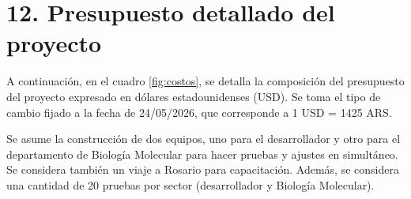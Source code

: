 \documentclass[
11pt, %
]{charter}
\begin{document}
\section{12. Presupuesto detallado del proyecto}
\label{sec:presupuesto}

A continuación, en el cuadro \ref{fig:costos}, se detalla la composición del presupuesto del proyecto expresado en dólares estadounidenses (USD). Se toma el tipo de cambio fijado a la fecha de 24/05/2026, que corresponde a 1 USD = 1425 ARS.

Se asume la construcción de dos equipos, uno para el desarrollador y otro para el departamento de Biología Molecular para hacer pruebas y ajustes en simultáneo. Se considera también un viaje a Rosario para capacitación. Además, se considera una cantidad de 20 pruebas por sector (desarrollador y Biología Molecular).
\end{document}
